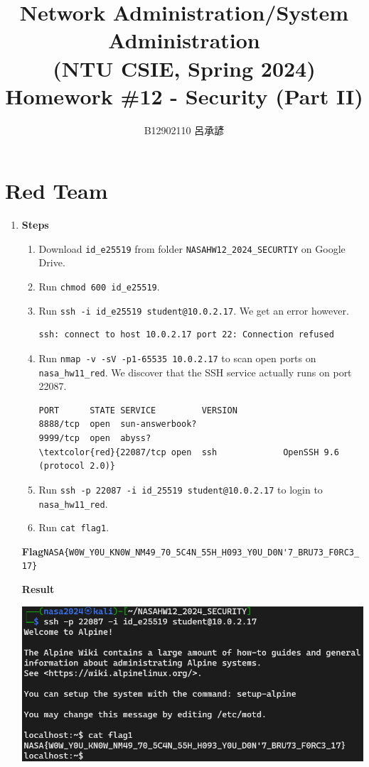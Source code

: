 \documentclass[12pt, a4paper]{article}
\title{
  \vspace{-1cm}
  Network Administration/System Administration\\
  (NTU CSIE, Spring 2024)\\
  Homework \#12 - Security (Part II)
}
\author{\Large B12902110 呂承諺}
\begin{document}
  \maketitle

  \section{Red Team}
  \begin{enumerate}[label=(\alph*)]
    \item \textbf{Steps}
    \begin{enumerate}[label=(\arabic*)]
      \item Download \verb|id_e25519| from folder \verb|NASAHW12_2024_SECURTIY| on Google Drive.
      \item Run \verb|chmod 600 id_e25519|.
      \item Run \verb|ssh -i id_e25519 student@10.0.2.17|. We get an error however.
      \begin{Verbatim}[frame=single]
ssh: connect to host 10.0.2.17 port 22: Connection refused
      \end{Verbatim}
      \item Run \verb|nmap -v -sV -p1-65535 10.0.2.17| to scan open ports on \verb|nasa_hw11_red|. We discover that the SSH service actually runs on
      port 22087.
      \begin{Verbatim}[frame=single, commandchars=\\\{\}]
PORT      STATE SERVICE         VERSION
8888/tcp  open  sun-answerbook?
9999/tcp  open  abyss?
\textcolor{red}{22087/tcp open  ssh             OpenSSH 9.6 (protocol 2.0)}
      \end{Verbatim}
      \item Run \verb|ssh -p 22087 -i id_25519 student@10.0.2.17| to login
      to \verb|nasa_hw11_red|.
      \item Run \verb|cat flag1|.
    \end{enumerate}
    \textbf{Flag}\quad\verb|NASA{W0W_Y0U_KN0W_NM49_70_5C4N_55H_H093_Y0U_D0N'7_BRU73_F0RC3_17}|

    \textbf{Result}

    \includegraphics[width=0.8\linewidth]{1-a_result.png}


\end{enumerate}
\end{document}
